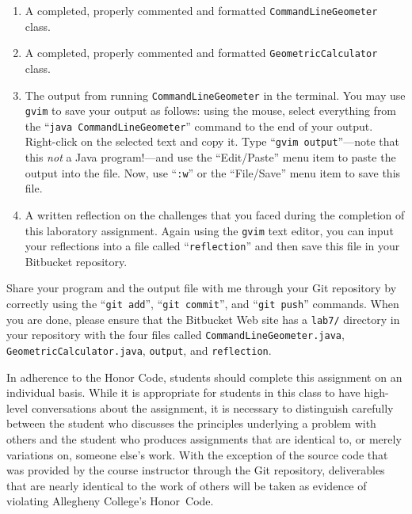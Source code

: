 \vspace*{-.05in}
\begin{enumerate}
    \setlength{\itemsep}{0pt}

  \item A completed, properly commented and formatted {\tt CommandLineGeometer} class.

  \item A completed, properly commented and formatted {\tt GeometricCalculator} class.

  \item The output from running {\tt CommandLineGeometer} in the terminal. You may use {\tt gvim} to save
    your output as follows: using the mouse, select everything from the ``{\tt java CommandLineGeometer}'' command
    to the end of your output.  Right-click on the selected text and copy it.  Type ``{\tt gvim output}''---note
    that this {\em not} a Java program!---and use the ``Edit/Paste'' menu item to paste the output into the file.
    Now, use ``{\tt :w}'' or the ``File/Save'' menu item to save this file.

  \item A written reflection on the challenges that you faced during the completion of this laboratory assignment.
    Again using the {\tt gvim} text editor, you can input your reflections into a file called ``{\tt reflection}''
    and then save this file in your Bitbucket repository.

\end{enumerate}
\vspace*{-.05in}

Share your program and the output file with me through your Git repository by correctly using the ``{\tt git add}'',
``{\tt git commit}'', and ``{\tt git push}'' commands. When you are done, please ensure that the Bitbucket Web site has
a {\tt lab7/} directory in your repository with the four files called {\tt CommandLineGeometer.java}, {\tt
GeometricCalculator.java}, {\tt output}, and {\tt reflection}.

In adherence to the Honor Code, students should complete this assignment on an individual basis. While it is appropriate
for students in this class to have high-level conversations about the assignment, it is necessary to distinguish
carefully between the student who discusses the principles underlying a problem with others and the student who produces
assignments that are identical to, or merely variations on, someone else's work.  With the exception of the source code
that was provided by the course instructor through the Git repository, deliverables that are nearly identical to the
work of others will be taken as evidence of violating Allegheny College's \mbox{Honor Code}.


